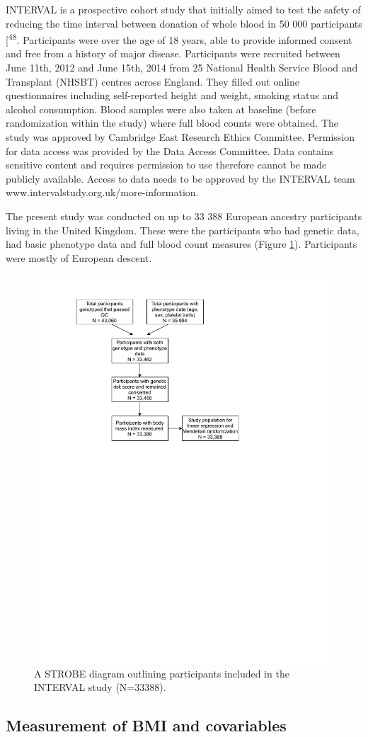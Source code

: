 \documentclass[11pt,twoside]{bristolthesis}
\begin{document}
INTERVAL is a prospective cohort study that initially aimed to test the safety of reducing the time interval between donation of whole blood in 50 000 participants {[}\textsuperscript{48}. Participants were over the age of 18 years, able to provide informed consent and free from a history of major disease. Participants were recruited between June 11th, 2012 and June 15th, 2014 from 25 National Health Service Blood and Transplant (NHSBT) centres across England. They filled out online questionnaires including self-reported height and weight, smoking status and alcohol consumption. Blood samples were also taken at baseline (before randomization within the study) where full blood counts were obtained. The study was approved by Cambridge East Research Ethics Committee. Permission for data access was provided by the Data Access Committee. Data contains sensitive content and requires permission to use therefore cannot be made publicly available. Access to data needs to be approved by the INTERVAL team www.intervalstudy.org.uk/more-information.

The present study was conducted on up to 33 388 European ancestry participants living in the United Kingdom. These were the participants who had genetic data, had basic phenotype data and full blood count measures (Figure \ref{fig:INTERVAL-STROBE}). Participants were mostly of European descent.
\begin{figure}
\includegraphics[width=0.8\linewidth,height=0.8\textheight]{figure/BMI_platelets/STROBE_diagram} \caption{A STROBE diagram outlining participants included in the INTERVAL study (N=33388).}\label{fig:INTERVAL-STROBE}
\end{figure}
\hypertarget{measurement-of-bmi-and-covariables}{%
\subsection{Measurement of BMI and covariables}\label{measurement-of-bmi-and-covariables}}
\end{document}
